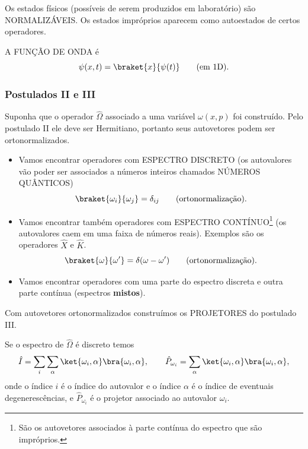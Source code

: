 Os estados físicos (possíveis de serem produzidos em laboratório) são NORMALIZÁVEIS. Os estados impróprios aparecem como autoestados de certos operadores.

A FUNÇÃO DE ONDA é
\begin{equation}
\label{eq:aula11_funcao_onda}
\psi(x,t) = \braket{x}{\psi(t)} \qquad \text{(em 1D)}.
\end{equation}

\subsubsection*{Postulados II e III}

Suponha que o operador $\hat{\Omega}$ associado a uma variável $\omega(x,p)$ foi construído. Pelo postulado II ele deve ser Hermitiano, portanto seus autovetores podem ser ortonormalizados.

\begin{itemize}
\item Vamos encontrar operadores com ESPECTRO DISCRETO (os autovalores vão poder ser associados a números inteiros chamados NÚMEROS QUÂNTICOS)
\begin{equation}
\braket{\omega_i}{\omega_j} = \delta_{ij} \qquad \text{(ortonormalização)}.
\end{equation}
\item Vamos encontrar também operadores com ESPECTRO CONTÍNUO\footnote{São os autovetores associados à parte contínua do espectro que são impróprios.} (os autovalores caem em uma faixa de números reais). Exemplos são os operadores $\hat{X}$ e $\hat{K}$.
\begin{equation}
\braket{\omega}{\omega'} = \delta(\omega - \omega') \qquad \text{(ortonormalização)}.
\end{equation}
\item Vamos encontrar operadores com uma parte do espectro discreta e outra parte contínua (espectros \textbf{mistos}).
\end{itemize}

Com autovetores ortonormalizados construímos os PROJETORES do postulado III.

Se o espectro de $\hat{\Omega}$ é discreto temos
\begin{equation}
\hat{I} = \sum_{i}\sum_{\alpha} \ket{\omega_i,\alpha}\bra{\omega_i,\alpha}, \qquad \hat{P}_{\omega_i} = \sum_{\alpha} \ket{\omega_i,\alpha}\bra{\omega_i,\alpha},
\end{equation}
onde o índice $i$ é o índice do autovalor e o índice $\alpha$ é o índice de eventuais degenerescências, e $\hat{P}_{\omega_i}$ é o projetor associado ao autovalor $\omega_i$.


